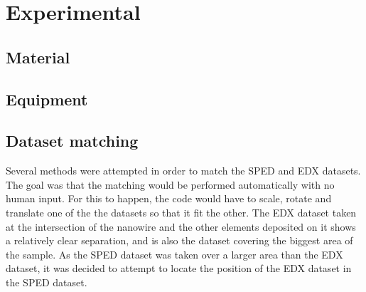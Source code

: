 \chapter{Experimental}

\section{Material}

\section{Equipment}

\section{Dataset matching}
\label{sec:method/dataset matching}

Several methods were attempted in order to match the SPED and EDX datasets. The goal was that the matching would be performed automatically with no human input. For this to happen, the code would have to scale, rotate and translate one of the the datasets so that it fit the other. The EDX dataset taken at the intersection of the nanowire and the other elements deposited on it shows a relatively clear separation, and is also the dataset covering the biggest area of the sample. As the SPED dataset was taken over a larger area than the EDX dataset, it was decided to attempt to locate the position of the EDX dataset in the SPED dataset.

